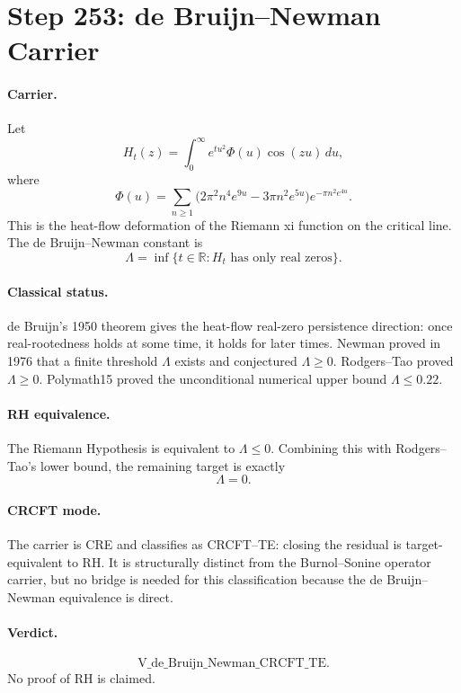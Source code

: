 \section*{Step 253: de Bruijn--Newman Carrier}

\paragraph{Carrier.}
Let
\[
H_t(z)=\int_0^\infty e^{t u^2}\Phi(u)\cos(zu)\,du,
\]
where
\[
\Phi(u)=\sum_{n\ge1}
\bigl(2\pi^2n^4 e^{9u}-3\pi n^2 e^{5u}\bigr)
e^{-\pi n^2e^{4u}}.
\]
This is the heat-flow deformation of the Riemann xi function on the critical
line.  The de Bruijn--Newman constant is
\[
\Lambda=\inf\{t\in\mathbb R: H_t \text{ has only real zeros}\}.
\]

\paragraph{Classical status.}
de Bruijn's 1950 theorem gives the heat-flow real-zero persistence direction:
once real-rootedness holds at some time, it holds for later times.  Newman
proved in 1976 that a finite threshold \(\Lambda\) exists and conjectured
\(\Lambda\ge0\).  Rodgers--Tao proved \(\Lambda\ge0\).  Polymath15 proved
the unconditional numerical upper bound \(\Lambda\le0.22\).

\paragraph{RH equivalence.}
The Riemann Hypothesis is equivalent to \(\Lambda\le0\).  Combining this with
Rodgers--Tao's lower bound, the remaining target is exactly
\[
\Lambda=0.
\]

\paragraph{CRCFT mode.}
The carrier is CRE and classifies as CRCFT--TE: closing the residual is
target-equivalent to RH.  It is structurally distinct from the Burnol--Sonine
operator carrier, but no bridge is needed for this classification because the
de Bruijn--Newman equivalence is direct.

\paragraph{Verdict.}
\[
\mathrm{V\_de\_Bruijn\_Newman\_CRCFT\_TE}.
\]
No proof of RH is claimed.
